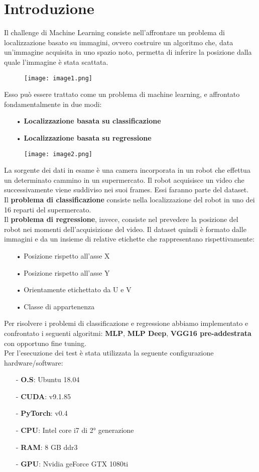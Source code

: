 \chapter{Introduzione}
Il challenge di Machine Learning consiste nell’affrontare un problema di localizzazione basato su immagini, ovvero costruire un algoritmo che, data un’immagine acquisita in uno spazio noto, permetta di inferire la posizione dalla quale l’immagine è stata scattata.
\begin{figure}[H]
	\centering
	\texttt{[image: image1.png]}
\end{figure}
Esso può essere trattato come un problema di machine learning, e affrontato fondamentalmente in due modi:
\begin{itemize}
	\item[•]\bf Localizzazione basata su classificazione
	\item[•]\bf Localizzazione basata su regressione
\end{itemize}	
\begin{figure}[H]
	\centering
	\texttt{[image: image2.png]}
\end{figure}
La sorgente dei dati in esame è una camera incorporata in un robot che effettua un determinato cammino in un supermercato. Il robot acquisisce un video che successivamente viene suddiviso nei suoi frames. Essi faranno parte del dataset.
\\
Il {\bf problema di classificazione} consiste nella localizzazione del robot in uno dei 16 reparti del supermercato.
\\
Il {\bf problema di regressione}, invece, consiste nel prevedere la posizione del robot nei momenti dell’acquisizione del video.
\newline
Il dataset quindi è formato dalle immagini e da un insieme di relative etichette che rappresentano rispettivamente:
\begin{itemize}
	\item[•] Posizione rispetto all’asse X
	\item[•] Posizione rispetto all’asse Y
	\item[•] Orientamente etichettato da U e V
	\item[•] Classe di appartenenza
\end{itemize}	
Per risolvere i problemi di classificazione e regressione abbiamo implementato e confrontato i seguenti algoritmi: {\bf MLP}, {\bf MLP Deep}, {\bf VGG16 pre-addestrata} con opportuno fine tuning. \\
Per l’esecuzione dei test è stata utilizzata la seguente configurazione hardware/software:
\begin{itemize}
	\item[-] {\bf O.S}: Ubuntu 18.04
	\item[-] {\bf CUDA}: v9.1.85
	\item[-] {\bf PyTorch}: v0.4
	\item[-] {\bf CPU}: Intel core i7 di 2° generazione
	\item[-] {\bf RAM}: 8 GB ddr3
	\item[-] {\bf GPU}: Nvidia geForce GTX 1080ti
\end{itemize}	
